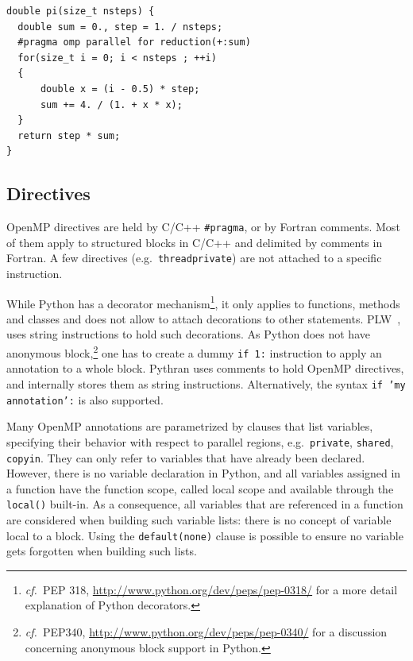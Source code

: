 \documentclass[conference]{IEEEtran}
\newcommand\see{\emph{cf.\ }}
\begin{document}
\begin{lstlisting}[float, label={lst:motivating-example-c}, caption={Motivating
example: computing $\pi$ in C with OpenMP.}]
double pi(size_t nsteps) {
  double sum = 0., step = 1. / nsteps;
  #pragma omp parallel for reduction(+:sum)
  for(size_t i = 0; i < nsteps ; ++i)
  {
      double x = (i - 0.5) * step;
      sum += 4. / (1. + x * x);
  }
  return step * sum;
}
\end{lstlisting}


\subsection{Directives}

OpenMP directives are held by C/C++ \texttt{\#pragma}, or by Fortran comments.
Most of them apply to structured blocks in C/C++ and delimited by comments in
Fortran. A few directives (e.g.\ \texttt{threadprivate}) are not attached to a
specific instruction.

While Python has a decorator mechanism\footnote{\see PEP 318,
\url{http://www.python.org/dev/peps/pep-0318/} for a more detail explanation of
Python decorators.}, it only applies to functions, methods and classes and does
not allow to attach decorations to other statements.
PLW~\cite{dongara2007}, uses string instructions to hold such decorations. As
Python does not have anonymous block,\footnote{\see PEP340,
    \url{http://www.python.org/dev/peps/pep-0340/} for a discussion concerning
anonymous block support in Python.} one has to create a dummy \texttt{if 1:}
instruction to apply an annotation to a whole block. Pythran uses comments to
hold OpenMP directives, and internally stores them as string instructions.
Alternatively, the syntax \texttt{if 'my annotation':} is also supported.

Many OpenMP annotations are parametrized by clauses that list variables,
specifying their behavior with respect to parallel regions,
e.g.\ \texttt{private}, \texttt{shared}, \texttt{copyin}. They can only refer to
variables that have already been declared. However, there is no variable
declaration in Python, and all variables assigned in a function have the
function scope, called local scope and available through the \texttt{local()}
built-in. As a consequence, all variables that are referenced in a function are
considered when building such variable lists: there is no concept of variable
local to a block. Using the \texttt{default(none)} clause is possible to ensure
no variable gets forgotten when building such lists.
\end{document}
